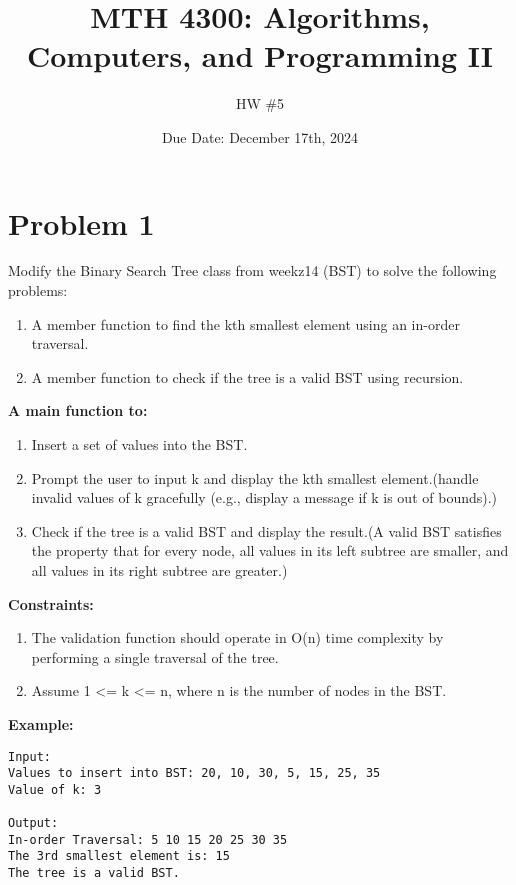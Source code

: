 \documentclass[a4paper]{article}
\title{MTH 4300: Algorithms, Computers, and Programming II}
\author{HW \#5}
\date{Due Date: December 17th, 2024}
\begin{document}
\maketitle


\section*{Problem 1}
Modify the  Binary Search Tree class from weekz14 (BST) to solve the following problems:\\

\begin{enumerate}
        \item A member function to find the kth smallest element using an in-order traversal.
        \item A member function to check if the tree is a valid BST using recursion.
\end{enumerate}

\textbf{A main function to:}
\begin{enumerate}
        \item Insert a set of values into the BST.
        \item Prompt the user to input k and display the kth smallest element.(handle invalid values of k gracefully (e.g., display a message if k is out of bounds).)
        \item Check if the tree is a valid BST and display the result.(A valid BST satisfies the property that for every node, all values in its left subtree are smaller, and all values in its right subtree are greater.)
\end{enumerate}


\textbf{Constraints:}
\begin{enumerate}
        \item The validation function should operate in O(n) time complexity by performing a single traversal of the tree.
        \item Assume 1 <= k <= n, where n is the number of nodes in the BST.
\end{enumerate}


\textbf{Example:}
\begin{verbatim}
Input:
Values to insert into BST: 20, 10, 30, 5, 15, 25, 35
Value of k: 3

Output:
In-order Traversal: 5 10 15 20 25 30 35
The 3rd smallest element is: 15
The tree is a valid BST.      
\end{verbatim}
\end{document}
